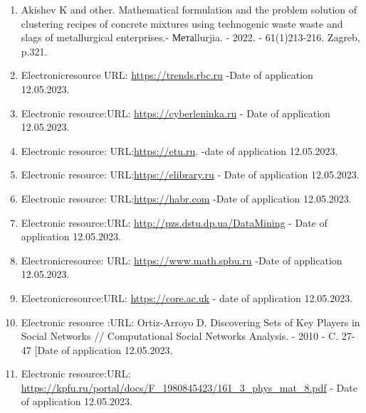 \begin{enumerate}
\item
Akishev K and other. Mathematical formulation and the problem
solution of clustering recipes of concrete mixtures using technogenic
waste waste and slags of metallurgical enterprises.- Метаllurjia. -
2022. - 61(1)213-216. Zagreb, p.321.

\item
Electronicresource URL: \href{https://trends.rbc.ru/trends/amp/news/61b359739a7947c7376ef7ce/}{https://trends.rbc.ru} -Date of application 12.05.2023.

\item
Electronic resource:URL: \href{https://cyberleninka.ru/article/n/analiz-i-klassifikatsiya-algoritmov-klasterizatsii}{https://cyberleninka.ru} - Date of application 12.05.2023.

\item
Electronic resource: URL:\href{https://etu.ru/assets/files/nauka/dissertacii/2009/SIElizarov.doc}{https://etu.ru}. -date of application 12.05.2023.

\item
Electronic resource: URL:\href{https://elibrary.ru/item.asp?id=45420956}{https://elibrary.ru} - Date of application
12.05.2023.

\item
Electronic resource: URL:\href{https://habr.com/ru/articles/322034/}{https://habr.com} -Date of application 12.05.2023.

\item
Electronic resource:URL:
\href{http://pzs.dstu.dp.ua/DataMining/cluster/bibl/\%25D0\%9A\%D0\%9B\%D0\%90\%D0\%A1\%D0\%A2\%D0\%95\%D0\%A0\%D0\%98\%D0\%97\%D0\%90\%D0\%A6\%D0\%98\%D0\%AF\%20\%D0\%9E\%D0\%91\%D0\%AA\%D0\%95\%D0\%9A\%D0\%A2\%D0\%9E\%D0\%92\%20\%D0\%A1\%20\%D0\%9F\%D0\%9E\%D0\%9C\%D0\%9E\%D0\%A9\%D0\%AC\%D0\%AE\%20\%D0\%90\%D0\%9B\%D0\%93\%D0\%9E\%D0\%A0\%D0\%98\%D0\%A2\%D0\%9C\%D0\%90\%20DBSCAN.pdf}{http://pzs.dstu.dp.ua/DataMining}
- Date of application 12.05.2023.

\item
Electronicresource: URL: \href{https://www.math.spbu.ru/SD_AIS/documents/2014-05-341/2014-05-tw11.pdf}{https://www.math.spbu.ru}
-Date of application 12.05.2023.

\item
Electronicresource:URL: \href{https://core.ac.uk/download/pdf/196226625.pdf}{https://core.ac.uk} - date of
application 12.05.2023.

\item
Electronic resource :URL: Ortiz-Arroyo D. Discovering Sets of Key
Players in Social Networks // Computational Social Networks Analysis. -
2010 - C. 27-47 {[}Date of application 12.05.2023.

\item
Electronic resource:URL:
\href{https://kpfu.ru/portal/docs/F_1980845423/161_3\%20_phys\%20_mat_8.pdf}{https://kpfu.ru/portal/docs/F\_1980845423/161\_3\_phys\_mat\_8.pdf} - Date of application 12.05.2023.
\end{enumerate}


